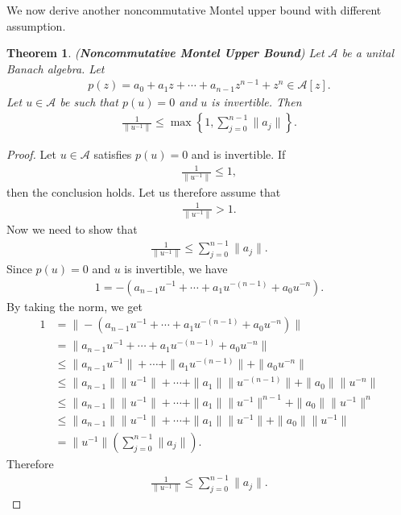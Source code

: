 \documentclass{amsart}
\newtheorem{theorem}{Theorem}[section]
\begin{document}
We now derive another noncommutative Montel upper bound with different assumption. 
\begin{theorem}\label{NMB}
(\textbf{Noncommutative Montel Upper Bound}) Let $\mathcal{A}$ be a unital Banach algebra. Let 
\begin{align*}
	p(z)=a_0+a_1z+\cdots+a_{n-1}z^{n-1}+z^n\in \mathcal{A}[z].
\end{align*}
Let $u \in \mathcal{A}$ be such that $p(u)=0$ and $u$ is invertible. Then
\begin{align*}
	\frac{1}{\|u^{-1}\|}\leq \max\left\{1, \sum_{j=0}^{n-1}\|a_j\|\right\}.
\end{align*}
\end{theorem}
\begin{proof}
Let $u \in \mathcal{A}$ satisfies $p(u)=0$ and  is invertible. If 
\begin{align*}
		\frac{1}{\|u^{-1}\|}\leq 1, 
\end{align*}
then the conclusion holds. Let us therefore assume that 
\begin{align*}
	\frac{1}{\|u^{-1}\|}> 1.
\end{align*}
Now we need to show that 
\begin{align*}
	\frac{1}{\|u^{-1}\|}\leq \sum_{j=0}^{n-1}\|a_j\|.
\end{align*}
Since $p(u)=0$ and $u$ is invertible, we have 
\begin{align*}
	1=-(a_{n-1}u^{-1}+\cdots+a_1u^{-(n-1)}+a_0u^{-n}).
\end{align*}
By taking the norm, we get 
\begin{align*}
	1&=\|-(a_{n-1}u^{-1}+\cdots+a_1u^{-(n-1)}+a_0u^{-n})\|\\
	&=\|a_{n-1}u^{-1}+\cdots+a_1u^{-(n-1)}+a_0u^{-n}\|\\
	&\leq \|a_{n-1}u^{-1}\|+\cdots+\|a_1u^{-(n-1)}\|+\|a_0u^{-n}\|\\
	&\leq \|a_{n-1}\|\|u^{-1}\|+\cdots+\|a_1\|\|u^{-(n-1)}\|+\|a_0\|\|u^{-n}\|\\
	&\leq \|a_{n-1}\|\|u^{-1}\|+\cdots+\|a_1\|\|u^{-1}\|^{n-1}+\|a_0\|\|u^{-1}\|^n\\
	&\leq  \|a_{n-1}\|\|u^{-1}\|+\cdots+\|a_1\|\|u^{-1}\|+\|a_0\|\|u^{-1}\|\\
	&=\|u^{-1}\|\left(\sum_{j=0}^{n-1}\|a_j\|\right).
\end{align*}
Therefore 
\begin{align*}
	\frac{1}{\|u^{-1}\|}\leq \sum_{j=0}^{n-1}\|a_j\|.
\end{align*}
\end{proof}
\end{document}
